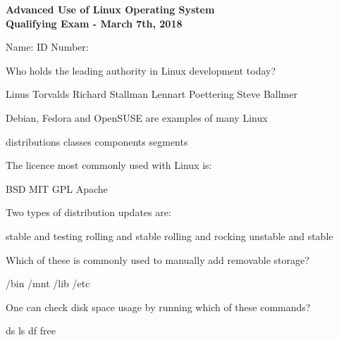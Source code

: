 \documentclass[a4paper,11pt]{exam}
\begin{document}
\firstpageheader
	{}
	{{\large \textbf{Advanced Use of Linux Operating System}}\\
		\textbf{Qualifying Exam - March 7th, 2018}}
	{}
\footer
	{}{}{\thepage}
	
Name: \fillin[][7cm] \hfill ID Number: \fillin[][5cm]\\

\begin{questions}
	\question
	Who holds the leading authority in Linux development today?
	
	\begin{oneparchoices}
		\CorrectChoice Linus Torvalds
		\choice Richard Stallman
		\choice Lennart Poettering
		\choice Steve Ballmer
	\end{oneparchoices}
	
	\question
	Debian, Fedora and OpenSUSE are examples of many Linux
	
	\begin{oneparchoices}
		\CorrectChoice distributions
		\choice classes
		\choice components
		\choice segments
	\end{oneparchoices}
	
	\question
	The licence most commonly used with Linux is:
	
	\begin{oneparchoices}
		\choice BSD
		\choice MIT
		\CorrectChoice GPL
		\choice Apache
	\end{oneparchoices}
	
	\question
  Two types of distribution updates are: 

	\begin{oneparchoices}
		    \choice stable and testing
        \CorrectChoice rolling and stable 
        \choice rolling and rocking
        \choice unstable and stable
	\end{oneparchoices}

	\question
  Which of these is commonly used to manually add removable storage?
	
	\begin{oneparchoices}
        \choice /bin
        \CorrectChoice /mnt
        \choice /lib
        \choice /etc
	\end{oneparchoices}
	
	\question
One can check disk space usage by running which of these commands?
	
	\begin{oneparchoices}
		\choice ds 
		\choice ls 
		\CorrectChoice df 
		\choice free
	\end{oneparchoices}
	

\end{questions}
\end{document}
